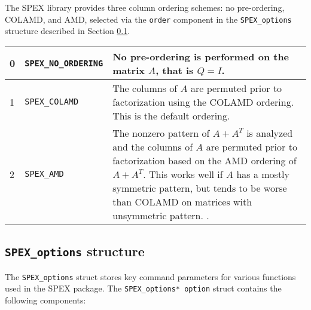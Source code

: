 \documentclass[12pt]{report}
\theoremstyle{definition}
\begin{document}
The SPEX library provides three column ordering schemes: no pre-ordering,
COLAMD, and AMD, selected via the \verb|order|
component in the \verb|SPEX_options| structure described in Section
\ref{ss:SPEX_options_struct}.

{\small
\begin{center}
\begin{tabular}{llp{4in}}
\hline
0 & \verb|SPEX_NO_ORDERING| & No pre-ordering is performed on the matrix $A$,
                              that is $Q = I$. \\
\hline
1 & \verb|SPEX_COLAMD|      & The columns of $A$ are permuted prior to
                              factorization using the COLAMD
                              \cite{davis2004algorithmcolamd} ordering.
                              This is the default ordering. \\
\hline
2 & \verb|SPEX_AMD|         & The nonzero pattern of $A + A^T$ is analyzed and
                              the columns of $A$ are permuted prior to
                              factorization based on the AMD
                              \cite{amestoy2004algorithmamd} ordering of
                              $A+A^T$. This works well if $A$ has a mostly
                              symmetric pattern, but tends to be worse
                              than COLAMD on matrices with unsymmetric pattern.
                              \cite{davis2004column}.\\
\hline
\end{tabular}
\label{tab:SPEX_pivot}
\end{center}
}

\cprotect\subsection{ \verb|SPEX_options| structure}
\label{ss:SPEX_options_struct}

The \verb|SPEX_options| struct stores key command parameters for various
functions used in the SPEX package. The \verb|SPEX_options* option| struct
contains the following components:
\end{document}
